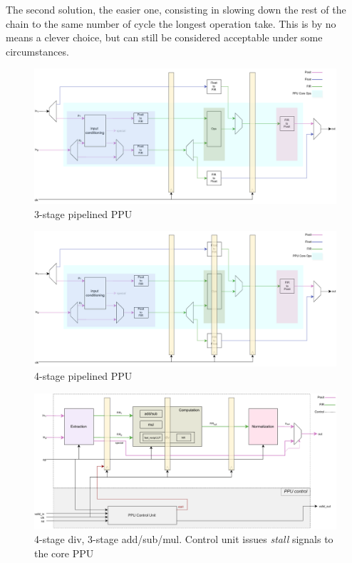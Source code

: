 The second solution, the easier one, consisting in slowing down the rest of the chain to the same number of cycle the longest operation take. This is by no means a clever choice, but can still be considered acceptable under some circumstances.




\begin{figure}
\centering
    \includegraphics[width=1\textwidth]{figures/top_all_PL2.pdf}
    \caption{3-stage pipelined PPU}
    \label{fig:top_all_PL2}
\end{figure}
\begin{figure}
\centering
    \includegraphics[width=1\textwidth]{figures/top_all_PL3.pdf}
    \caption{4-stage pipelined PPU}
    \label{fig:top_all_PL3}
\end{figure}


\begin{figure}[h!]
    \centering
    \includegraphics[width=1\textwidth]{figures/ppu_all_with_control_unit_3a.pdf}
    \caption{4-stage div, 3-stage add/sub/mul. Control unit issues \textit{stall} signals to the core PPU}
    \label{fig:ppu_with_control_unit1}
\end{figure}%
 
